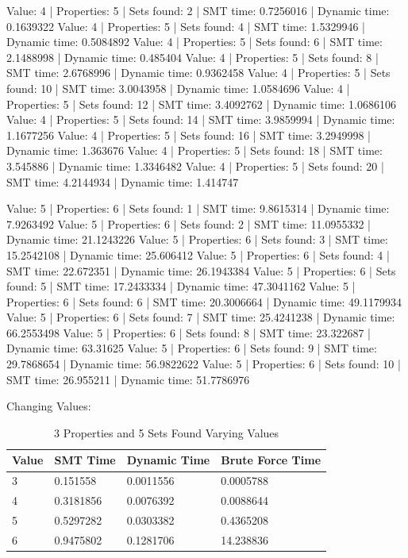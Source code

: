 \documentclass[pageno]{jpaper}
\begin{document}
Value: 4 | Properties: 5 | Sets found: 2 | SMT time: 0.7256016 | Dynamic time: 0.1639322
Value: 4 | Properties: 5 | Sets found: 4 | SMT time: 1.5329946 | Dynamic time: 0.5084892
Value: 4 | Properties: 5 | Sets found: 6 | SMT time: 2.1488998 | Dynamic time: 0.485404
Value: 4 | Properties: 5 | Sets found: 8 | SMT time: 2.6768996 | Dynamic time: 0.9362458
Value: 4 | Properties: 5 | Sets found: 10 | SMT time: 3.0043958 | Dynamic time: 1.0584696
Value: 4 | Properties: 5 | Sets found: 12 | SMT time: 3.4092762 | Dynamic time: 1.0686106
Value: 4 | Properties: 5 | Sets found: 14 | SMT time: 3.9859994 | Dynamic time: 1.1677256
Value: 4 | Properties: 5 | Sets found: 16 | SMT time: 3.2949998 | Dynamic time: 1.363676
Value: 4 | Properties: 5 | Sets found: 18 | SMT time: 3.545886 | Dynamic time: 1.3346482
Value: 4 | Properties: 5 | Sets found: 20 | SMT time: 4.2144934 | Dynamic time: 1.414747


Value: 5 | Properties: 6 | Sets found: 1 | SMT time: 9.8615314 | Dynamic time: 7.9263492
Value: 5 | Properties: 6 | Sets found: 2 | SMT time: 11.0955332 | Dynamic time: 21.1243226
Value: 5 | Properties: 6 | Sets found: 3 | SMT time: 15.2542108 | Dynamic time: 25.606412
Value: 5 | Properties: 6 | Sets found: 4 | SMT time: 22.672351 | Dynamic time: 26.1943384
Value: 5 | Properties: 6 | Sets found: 5 | SMT time: 17.2433334 | Dynamic time: 47.3041162
Value: 5 | Properties: 6 | Sets found: 6 | SMT time: 20.3006664 | Dynamic time: 49.1179934
Value: 5 | Properties: 6 | Sets found: 7 | SMT time: 25.4241238 | Dynamic time: 66.2553498
Value: 5 | Properties: 6 | Sets found: 8 | SMT time: 23.322687 | Dynamic time: 63.31625
Value: 5 | Properties: 6 | Sets found: 9 | SMT time: 29.7868654 | Dynamic time: 56.9822622
Value: 5 | Properties: 6 | Sets found: 10 | SMT time: 26.955211 | Dynamic time: 51.7786976





Changing Values:

\begin{table}[hbt]
  \centering
  \begin{tabular}{|l   |l   |l |l | } \hline
    \textbf{Value} & \textbf{SMT Time}  & \textbf{Dynamic Time} & \textbf{Brute Force Time} \\\hline
    3          &   0.151558  &  0.0011556 & 0.0005788 \\ \hline 
    4          &   0.3181856 &  0.0076392 &  0.0088644 \\ \hline 
    5          &   0.5297282 &  0.0303382 &  0.4365208\\ \hline 
    6        &   0.9475802 &  0.1281706  & 14.238836 \\ \hline 
  \end{tabular}
  \caption{3 Properties and 5 Sets Found Varying Values}
  \label{table:data}
\end{table}
\end{document}
